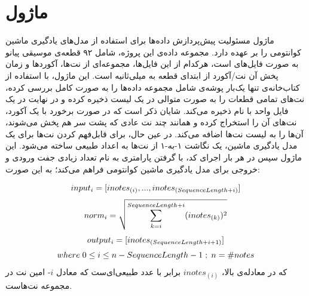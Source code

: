 \section{ماژول 
} \label{sec:midi_module}
ماژول
مسئولیت پیش‌پردازش داده‌ها برای استفاده از مدل‌های یادگیری ماشین کوانتومی را بر عهده دارد.
مجموعه داده‌ی این پروژه، شامل ۹۲ قطعه‌ی موسیقی پیانو به صورت فایل‌های 
است، هرکدام از این فایل‌ها، مجموعه‌ای از نت‌ها، آکوردها و زمان پخش آن نت/آکورد از ابتدای قطعه به میلی‌ثانیه است.
این ماژول، با استفاده از کتاب‌خانه‌ی 
تنها یک‌بار پوشه‌ی شامل مجموعه داده‌ها را به صورت کامل بررسی کرده، نت‌های تمامی قطعات را به صورت متوالی در یک لیست ذخیره کرده و در نهایت در یک فایل واحد با نام
ذخیره می‌کند. شایان ذکر است که در صورت برخورد با یک آکورد، نت‌های آن را استخراج کرده و همانند چند نت عادی که پشت سر هم پخش می‌شوند، آن‌ها را به لیست نت‌ها اضافه می‌کند.
در عین حال، برای قابل‌فهم کردن نت‌ها برای یک مدل یادگیری ماشین، یک نگاشت ۱-به-۱
از نت‌ها به اعداد طبیعی ساخته می‌شود.
این ماژول سپس در هر بار اجرای کد، با گرفتن پارامتری به نام
تعداد زیادی جفت ورودی و خروجی برای مدل یادگیری ماشین کوانتومی فراهم می‌کند؛ به این صورت:

\begin{equation}
    \begin{gathered}
    input_i = [inotes_{(i)}, ..., inotes_{(SequenceLength + i)}] \\[3pt]
    norm_i = \sqrt{\sum^{SequenceLength+i}_{k=i} (inotes_{(k)})^2 } \\[3pt]
    output_i = [inotes_{(SequenceLength + i + 1)}] \\[3pt]
    where \hspace{1mm} 0 \leq i \leq n - SequenceLength - 1 \hspace{1mm} ; \hspace{1mm} n = \#notes
    \end{gathered}
\end{equation}
که در معادله‌ی بالا،
$inotes_{(i)}$
برابر با عدد طبیعی‌ای‌ست که معادل
$i$-
امین نت در مجموعه نت‌هاست.
